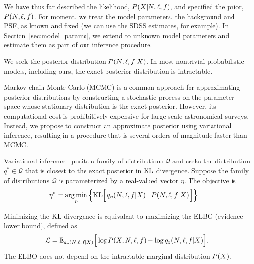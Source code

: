 We have thus far described the likelihood,
$P(X | N, \ell, f)$, and specified the prior, $P(N, \ell, f)$. 
For moment, we treat the model parameters, the background and PSF, as known and fixed
(we can use the SDSS estimates, for example). In Section~\ref{sec:model_params}, we extend to unknown 
model parameters and estimate them as part of our inference procedure. 

We seek the posterior distribution 
$P(N, \ell, f | X)$. In most nontrivial probabilistic models, including ours, the exact posterior distribution is intractable.

Markov chain Monte Carlo (MCMC) is a common approach for approximating
posterior distributions by constructing a stochastic process on the parameter space whose stationary distribution is the exact posterior.
However, its computational cost is prohibitively expensive for
large-scale astronomical surveys. Instead, we propose to construct an approximate posterior using variational inference, resulting in a procedure that is several orders of magnitude faster than MCMC.

Variational inference~\cite{Blei_2017_vi_review, Jordan_intro_vi, Wainwrite_graph_models_vi}
posits a family of distributions $\mathcal{Q}$ and seeks
the distribution $q^*\in \mathcal{Q}$ that is closest to the exact posterior
in $\textrm{KL}$ divergence. Suppose the family of distributions $\mathcal{Q}$ is parameterized by a real-valued vector $\eta$. The objective is 
\begin{align}
   \eta^* &= \operatorname*{arg\,min}_{\eta} \Big\{ \mathrm{KL}\Big[\,q_\eta(N, \ell, f | X)\, \| \,P(N, \ell, f | X )\,\Big]\Big\} 
   \label{eq:kl_objective}
\end{align}

Minimizing the $\textrm{KL}$ divergence is equivalent to maximizing the ELBO (evidence lower bound), defined as 
\begin{align}
    \mathcal{L} = 
    \mathbb{E}_{q_\eta(N, \ell, f | X)}\Big[\log P(X, N, \ell, f) - \log q_\eta(N, \ell, f | X)\Big].
    \label{eq:elbo}
\end{align}
The ELBO does not depend on the intractable marginal distribution $P(X)$.

